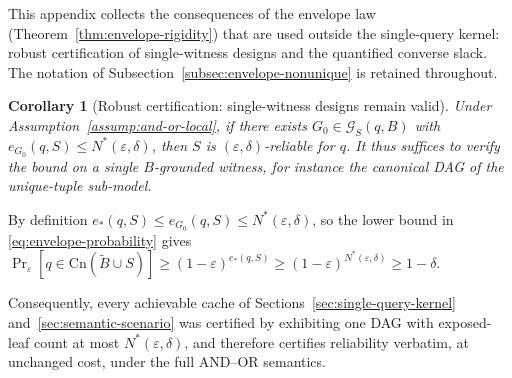 \documentclass[journal]{IEEEtran}
\makeatletter
\newcommand{\Cn}{\text{Cn}}
\newtheorem{corollary}{Corollary}[section]
\numberwithin{equation}{section}
\renewenvironment{proof}[1][\proofname]{\par
  \pushQED{\qed}%
  \normalfont \topsep6\p@\@plus6\p@\relax
  \trivlist
  \item[\hskip\labelsep
        \itshape
    #1\@addpunct{.}]\ignorespaces
}{%
  \popQED\endtrivlist\@endpefalse
}
\makeatother
\begin{document}
This appendix collects the consequences of the envelope law
(Theorem~\ref{thm:envelope-rigidity}) that are used outside the single-query
kernel: robust certification of single-witness designs and the quantified
converse slack.  The notation of
Subsection~\ref{subsec:envelope-nonunique} is retained throughout.

\begin{corollary}[Robust certification: single-witness designs remain valid]
\label{cor:envelope-certified-threshold}
Under Assumption~\ref{assump:and-or-local}, if there exists
\(G_0\in\mathcal G_S(q,B)\) with \(e_{G_0}(q,S)\le N^*(\varepsilon,\delta)\),
then \(S\) is \((\varepsilon,\delta)\)-reliable for \(q\).  It thus suffices
to verify the bound on a single \(B\)-grounded witness, for instance the
canonical DAG of the unique-tuple sub-model.
\end{corollary}

\begin{proof}
By definition \(e_*(q,S)\le e_{G_0}(q,S)\le N^*(\varepsilon,\delta)\), so the
lower bound in \eqref{eq:envelope-probability} gives
\(\Pr_{\varepsilon}[q\in\Cn(\widetilde B\cup S)]
\ge(1-\varepsilon)^{e_*(q,S)}
\ge(1-\varepsilon)^{N^*(\varepsilon,\delta)}\ge1-\delta\).
\end{proof}

Consequently, every achievable cache of
Sections~\ref{sec:single-query-kernel} and~\ref{sec:semantic-scenario} was
certified by exhibiting one DAG with exposed-leaf count at most
\(N^*(\varepsilon,\delta)\), and therefore certifies reliability verbatim,
at unchanged cost, under the full AND--OR semantics.
\end{document}
